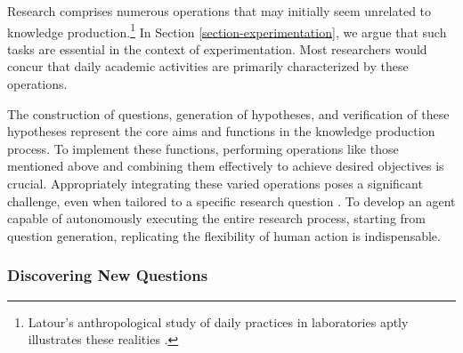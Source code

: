 Research comprises numerous operations that may initially seem unrelated to knowledge production.\footnote{
Latour's anthropological study of daily practices in laboratories aptly illustrates these realities \cite{latour1987science}.
} In Section \ref{section-experimentation}, we argue that such tasks are essential in the context of experimentation. Most researchers would concur that daily academic activities are primarily characterized by these operations.

The construction of questions, generation of hypotheses, and verification of these hypotheses represent the core aims and functions in the knowledge production process. To implement these functions, performing operations like those mentioned above and combining them effectively to achieve desired objectives is crucial. Appropriately integrating these varied operations poses a significant challenge, even when tailored to a specific research question \cite{coley2020autonomousII}. 
To develop an agent capable of autonomously executing the entire research process, starting from question generation, replicating the flexibility of human action is indispensable.



\subsubsection{Discovering New Questions}

